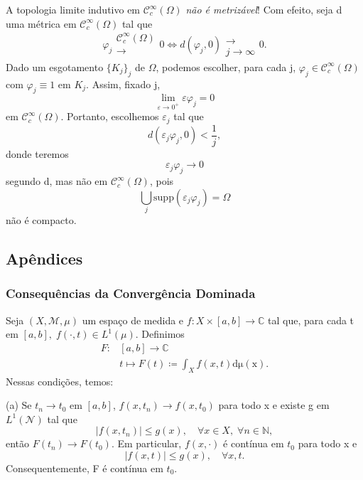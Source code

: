 \documentclass[../distribution_theory_notes.tex]{subfiles}
\begin{document}
\begin{tcolorbox}[
		skin=enhanced,
		title=Observação,
		fonttitle=\bfseries,
		colframe=black,
		colbacktitle=cyan!75!white,
		colback=cyan!15,
		colbacklower=black,
		coltitle=black,
		drop fuzzy shadow,
	]
	A topologia limite indutivo em \(\mathcal{C}_{c}^{\infty}(\Omega )\) \textit{não é metrizável}! Com efeito, seja d uma métrica em \(\mathcal{C}_{c}^{\infty}(\Omega )\) tal que
	\[
		\varphi_{j}\substack{\mathcal{C}_{c}^{\infty}(\Omega ) \\ \longrightarrow \\ }0 \Longleftrightarrow d(\varphi_{j}, 0)\substack{ \\ \longrightarrow \\ j\to \infty}0.
	\]
	Dado um esgotamento \(\{K_{j}\}_{j}\) de \(\Omega \), podemos escolher, para cada j, \(\varphi_{j}\in \mathcal{C}_{c}^{\infty}(\Omega )\) com \(\varphi_{j}\equiv 1\) em \(K_{j}.\) Assim, fixado j,
	\[
		\lim_{\varepsilon \to 0^{+}}\varepsilon \varphi_{j}=0
	\]
	em \(\mathcal{C}_{c}^{\infty}(\Omega )\). Portanto, escolhemos \(\varepsilon_{j}\) tal que
	\[
		d(\varepsilon_{j}\varphi_{j}, 0)< \frac{1}{j},
	\]
	donde teremos
	\[
		\varepsilon_{j}\varphi_{j}\to 0
	\]
	segundo d, mas não em \(\mathcal{C}_{c}^{\infty}(\Omega )\), pois
	\[
		\bigcup_{j}^{}\mathrm{supp}(\varepsilon_{j}\varphi_{j})=\Omega
	\]
	não é compacto.

\end{tcolorbox}
\subsection{Apêndices}
\subsubsection{Consequências da Convergência Dominada}
Seja \((X, \mathcal{M}, \mu )\) um espaço de medida e \(f:X\times [a, b]\rightarrow \mathbb{C}\) tal que, para cada t em \([a, b],\; f(\cdot , t)\in L^{1}(\mu )\). Definimos
\begin{align*}
	F: & [a, b]\rightarrow \mathbb{C}                                      \\
	   & t \longmapsto F(t)\coloneqq \int_{X}^{}f(x, t) \mathrm{d\mu (x)}.
\end{align*}
Nessas condições, temos:

(a) Se \(t_{n}\to t_{0}\) em \([a, b]\), \(f(x, t_{n})\rightarrow f(x, t_{0})\) para todo x e existe g em \(L^{1}(\mathcal{N})\) tal que
\[
	| f(x, t_{n}) |\leq g(x),\quad \forall x\in X,\; \forall n\in \mathbb{N},
\]
então \(F(t_{n})\to F(t_{0})\). Em particular, \(f(x, \cdot )\) é contínua em \(t_{0}\) para todo x e
\[
	| f(x, t) |\leq g(x),\quad \forall x, t.
\]
Consequentemente, F é contínua em \(t_{0}.\)
\end{document}
